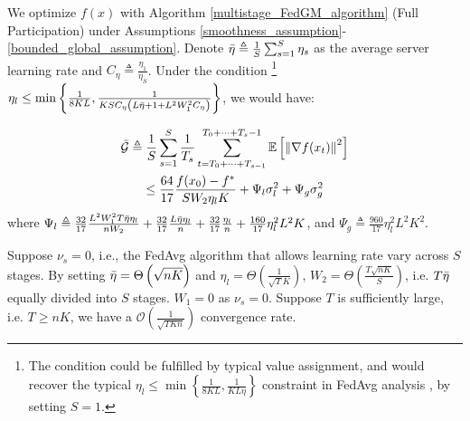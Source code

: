 \begin{theorem}
\label{multistage_fedgm_full_participation_convergence_theorem}
We optimize $f(x)$ with Algorithm \ref{multistage_FedGM_algorithm} (Full Participation) under Assumptions \ref{smoothness_assumption}-\ref{bounded_global_assumption}. Denote $\Bar{\eta} \triangleq \frac{1}{S}\sum_{s=1}^S \eta_s$ as the average server learning rate and $C_\eta\triangleq\frac{\eta_1}{\eta_S}$. Under the condition \footnote{The condition could be fulfilled by typical value assignment, and would recover the typical $\eta_l\leq\min\left\{\frac{1}{8KL},\frac{1}{KL\eta}\right\}$ constraint in FedAvg analysis \citep{yang2021achieving}, by setting $S=1$.} $\eta_l\leq\min\left\{\frac{1}{8KL},\frac{1}{K S C_\eta \left(L \Bar{\eta}  + 1 + L^2 W_1^2 C_\eta \right)}\right\}$, we would have:

\begin{gather*}
\Bar{\mathcal{G}}  \triangleq \frac{1}{S} \sum_{s=1}^{S} \frac{1}{T_s} \sum_{t=T_0+\dots+T_{s-1}}^{T_0+\dots+T_s-1} \mathbb{E}\left[\left\|\nabla f(x_t)\right\|^2\right] \\
 \leq \frac{64}{17}\frac{f(x_0)-f^\ast}{S W_2 \eta_l K} + \Psi_l \sigma_l^2 + \Psi_g  \sigma_g^2
\label{multistage_fedgm_full_participation_bound}
\end{gather*}
where $\Psi_l  \triangleq \frac{32}{17}\frac{L^2 W_1^2 T \Bar{\eta} \eta_l}{n W_2} +\frac{32}{17} \frac{L \Bar{\eta} \eta_l }{n} +\frac{32}{17}\frac{\eta_l}{n}+\frac{160}{17} \eta_l^2L^2K$, and $\Psi_g \triangleq \frac{960}{17} \eta_l^2L^2K^2$.


\end{theorem}

\begin{corollary}
Suppose $\nu_s=0$, i.e., the FedAvg algorithm that allows learning rate vary across $S$ stages. By setting $\Bar{\eta}=\Theta\left(\sqrt{nK}\right)$ and $\eta_l=\Theta\left(\frac{1}{\sqrt{T}K}\right)$, $W_2=\Theta\left(\frac{T\sqrt{nK}}{S}\right)$, i.e. $T\Bar{\eta}$ equally divided into $S$ stages. $W_1=0$ as $\nu_s=0$. Suppose $T$ is sufficiently large, i.e. $T\ge nK$, we have a $\mathcal{O}\left(\frac{1}{\sqrt{TKn}}\right)$ convergence rate.
\label{corollary:multistage_fedavg_full_participation}
\end{corollary}

\iffalse
\begin{remark}[Same Rate as Vanilla FedAvg]
Corollary \ref{corollary:multistage_fedavg_full_participation} indicates multistage FedAvg matches the best known rate for general FL nonconvex optimization approaches, e.g. SCAFFOLD \citep{karimireddy2020scaffold} and FedAdam \citep{reddi2020adaptive}. Note single-stage FedAvg with two-sided learning rates also achieves the same rate \citep{yang2021achieving}. However, we do observe multistage FedAvg converges empirically much better than single-stage FedAvg. It is unclear whether we could devise a scheduler such that with its corresponding $\Bar{\eta}$ and $W_2$, we could show an accelerating effect of stage $S$ and we will leave it as an interesting future direction. 
\label{remark:full_participation_same_rate}
\end{remark}
\fi

